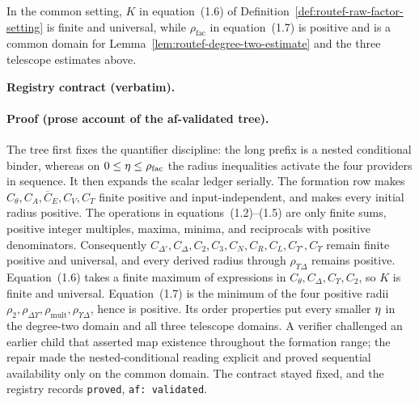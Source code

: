 \begin{lemma}\label{lem:routef-k-finiteness}
In the common setting, $K$ in equation~(1.6) of
Definition~\ref{def:routef-raw-factor-setting} is finite and universal, while
$\rho_{\mathrm{fac}}$ in equation~(1.7) is positive and is a common domain for
Lemma~\ref{lem:routef-degree-two-estimate} and the three telescope estimates above.
\end{lemma}
\noindent\textbf{Registry contract (verbatim).} 
\paragraph{Proof (prose account of the af-validated tree).}
The tree first fixes the quantifier discipline: the long prefix is a nested conditional
binder, whereas on $0\le\eta\le\rho_{\mathrm{fac}}$ the radius inequalities activate
the four providers in sequence. It then expands the scalar ledger serially. The formation
row makes $C_{\theta},C_A,\overline C_E,C_V,C_T$ finite positive and input-independent,
and makes every initial radius positive. The operations in equations~(1.2)--(1.5) are only
finite sums, positive integer multiples, maxima, minima, and reciprocals with positive
denominators. Consequently $C_{\Delta'},C_{\Delta},C_2,C_3,C_N,C_R,C_L,
C_{\Upsilon'},C_{\Upsilon}$ remain finite positive and universal, and every derived radius
through $\rho_{\Upsilon\Delta}$ remains positive. Equation~(1.6) takes a finite maximum
of expressions in $C_{\theta},C_{\Delta},C_{\Upsilon},C_2$, so $K$ is finite and universal.
Equation~(1.7) is the minimum of the four positive radii
$\rho_2,\rho_{\Delta\Upsilon},\rho_{\mathrm{mult}},\rho_{\Upsilon\Delta}$, hence is
positive. Its order properties put every smaller $\eta$ in the degree-two domain and
all three telescope domains. A verifier challenged an earlier child that asserted map
existence throughout the formation range; the repair made the nested-conditional reading
explicit and proved sequential availability only on the common domain. The contract stayed
fixed, and the registry records \texttt{proved}, \texttt{af: validated}.


